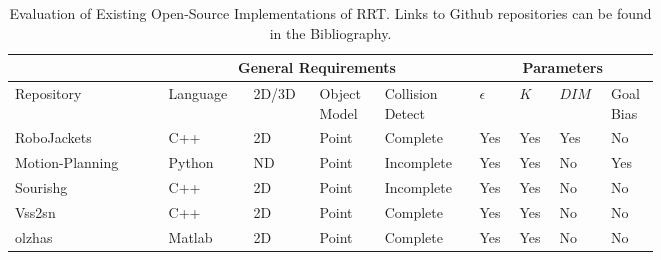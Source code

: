 
\begin{table}[H]
\begin{centering}
\begin{tabular}{|p{0.2\linewidth}|p{0.1\linewidth}|p{0.08\linewidth}|p{0.08\linewidth}|p{0.11\linewidth}|p{0.04\linewidth}|p{0.04\linewidth}|p{0.05\linewidth}|p{0.05\linewidth}|}
\hline
    & \multicolumn{4}{c|}{\textbf{General Requirements}} & \multicolumn{4}{c|}{\textbf{Parameters}} \\
\hline
Repository  & Language  &  2D/3D  & Object Model & Collision Detect& $\epsilon$ &  $K$ &  $DIM$ & Goal Bias \\
\hline
RoboJackets\cite{RoboJackets2019}  & 
    \textcolor{mygreen}{C++}    &  \textcolor{myred}{2D}    & \textcolor{myred}{Point} & \textcolor{mygreen}{Complete}&
    \textcolor{mygreen}{Yes} & \textcolor{mygreen}{Yes}  & \textcolor{mygreen}{Yes} & \textcolor{myred}{No}
    \\
\hline
Motion-Planning\cite{Planning2019} &
    \textcolor{myred}{Python}    &  \textcolor{mygreen}{ND}    & \textcolor{myred}{Point} & \textcolor{myred}{Incomplete} &
    \textcolor{mygreen}{Yes} & \textcolor{mygreen}{Yes}  & \textcolor{myred}{No} & \textcolor{mygreen}{Yes}
    \\
\hline
Sourishg\cite{Sourishg2017} &
    \textcolor{mygreen}{C++}    &  \textcolor{myred}{2D}    & \textcolor{myred}{Point} & \textcolor{myred}{Incomplete} &
    \textcolor{mygreen}{Yes} & \textcolor{mygreen}{Yes}  & \textcolor{myred}{No} & \textcolor{myred}{No}
    \\
\hline
Vss2sn\cite{Vss2sn2019} &
    \textcolor{mygreen}{C++}    &  \textcolor{myred}{2D}    & \textcolor{myred}{Point} & \textcolor{mygreen}{Complete} &
    \textcolor{mygreen}{Yes} & \textcolor{mygreen}{Yes}  & \textcolor{myred}{No} & \textcolor{myred}{No}
    \\
\hline
olzhas\cite{Olzhas2017} &
    \textcolor{myred}{Matlab}    &  \textcolor{myred}{2D}    & \textcolor{myred}{Point} & \textcolor{mygreen}{Complete} &
    \textcolor{mygreen}{Yes} & \textcolor{mygreen}{Yes}  & \textcolor{myred}{No} & \textcolor{myred}{No}
    \\
\hline
\end{tabular}
\caption[Evaluation of Existing Open-Source Implementations of RRT]{Evaluation of Existing Open-Source Implementations of RRT. Links to Github repositories can be found in the Bibliography.}
\end{centering}
\end{table}